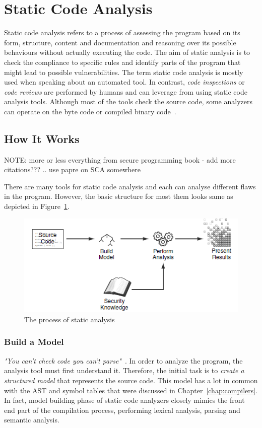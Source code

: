 \documentclass[
  digital, %
  table,   %
  lof,     %
  lot,     %
  oneside,
]{fithesis3}
\begin{document}
\section{Static Code Analysis}
Static code analysis refers to a process of assessing the program based on its form, structure, content and documentation and reasoning over its possible behaviours without actually executing the code. The aim of static analysis is to check the compliance to specific rules and identify parts of the program that might lead to possible vulnerabilities. The term static code analysis is mostly used when speaking about an automated tool. In contrast, \textit{code inspections} or \textit{code reviews} are performed by humans and can leverage from using static code analysis tools. Although most of the tools check the source code, some analyzers can operate on the byte code or compiled binary code~\cite{oswap-sca, ppt-sca}.

\subsection{How It Works}
NOTE: more or less everything from secure programming book - add more citations??? .. use papre on SCA somewhere

There are many tools for static code analysis and each can analyse different flaws in the program. However, the basic structure for most them looks same as depicted in Figure~\ref{fig:static-code-analysis-internals}.

\begin{figure}[h!]
		\centering
			\includegraphics[scale=0.6]{img/static-code-analysis-internals}
		\caption{The process of static analysis~\cite{secure-programming-sca}}
		\label{fig:static-code-analysis-internals}
\end{figure}

\subsubsection{Build a Model}
\textit{"You can't check code you can't parse"}~\cite{coverity-sca}.
In order to analyze the program, the analysis tool must first understand it. Therefore, the initial task is to \textit{create a structured model} that represents the source code. This model has a lot in common with the AST and symbol tables that were discussed in Chapter~\ref{chap:compilers}. In fact, model building phase of static code analyzers closely mimics the front end part of the compilation process, performing lexical analysis, parsing and semantic analysis.
\end{document}
